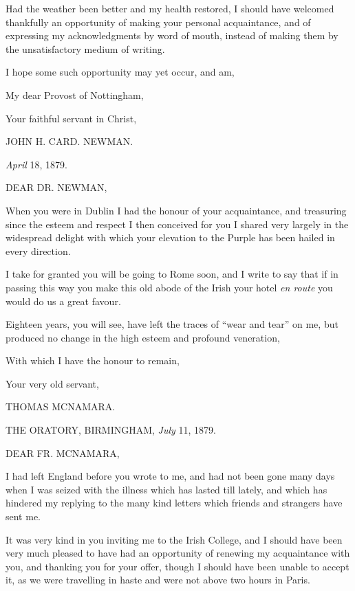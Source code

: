 Had the weather been better and my health restored, I should have
welcomed thankfully an opportunity of making your personal
acquaintance, and of expressing my acknowledgments by word of mouth,
instead of making them by the unsatisfactory medium of writing.

I hope some such opportunity may yet occur, and am,

My dear Provost of Nottingham,

Your faithful servant in Christ,

JOHN H. CARD. NEWMAN.


\emph{April} 18, 1879.

DEAR DR. NEWMAN,

When you were in Dublin I had the honour of your acquaintance, and
treasuring since the esteem and respect I then conceived for you I
shared very largely in the widespread delight with which your
elevation to the Purple has been hailed in every direction.

I take for granted you will be going to Rome soon, and I write to
say that if in passing this way you make this old abode of the
Irish your hotel \emph{en route} you would do us a great favour.

Eighteen years, you will see, have left the traces of ``wear
and tear'' on me, but produced no change in the high esteem and
profound veneration,

With which I have the honour to remain,

Your very old servant,

THOMAS MCNAMARA.


THE ORATORY, BIRMINGHAM,
\emph{July} 11, 1879.

DEAR FR. MCNAMARA,

I had left England before you wrote to me, and had not been gone many
days when I was seized with the illness which has lasted till lately,
and which has hindered my replying to the many kind letters which
friends and strangers have sent me.

It was very kind in you inviting me to the Irish College, and I
should have been very much pleased to have had an opportunity of
renewing my acquaintance with you, and thanking you for your offer,
though I should have been unable to accept it, as we were travelling
in haste and were not above two hours in Paris.

